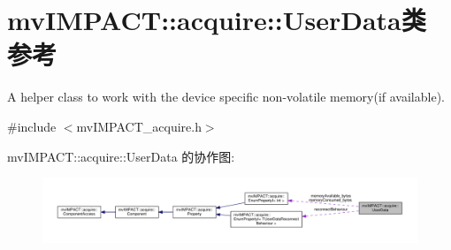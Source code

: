 \hypertarget{classmv_i_m_p_a_c_t_1_1acquire_1_1_user_data}{\section{mv\+I\+M\+P\+A\+C\+T\+:\+:acquire\+:\+:User\+Data类 参考}
\label{classmv_i_m_p_a_c_t_1_1acquire_1_1_user_data}
}


A helper class to work with the device specific non-\/volatile memory(if available).  




{\ttfamily \#include $<$mv\+I\+M\+P\+A\+C\+T\+\_\+acquire.\+h$>$}



mv\+I\+M\+P\+A\+C\+T\+:\+:acquire\+:\+:User\+Data 的协作图\+:
\nopagebreak
\begin{figure}[H]
\begin{center}
\leavevmode
\includegraphics[width=350pt]{classmv_i_m_p_a_c_t_1_1acquire_1_1_user_data__coll__graph}
\end{center}
\end{figure}
